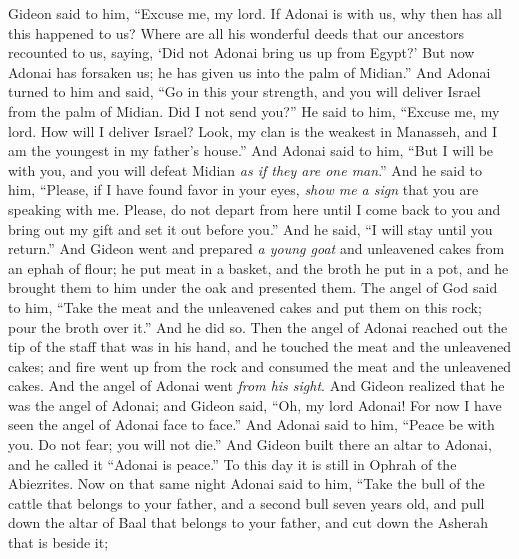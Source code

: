 \begin{biblechapter}
\verse Gideon said to him, “Excuse me, my lord. If Adonai is with us, why then has all this happened to us? Where are all his wonderful deeds that our ancestors recounted to us, saying, ‘Did not Adonai bring us up from Egypt?’ But now Adonai has forsaken us; he has given us into the palm of Midian.”
\verse And Adonai turned to him and said, “Go in this your strength, and you will deliver Israel from the palm of Midian. Did I not send you?”
\verse He said to him, “Excuse me, my lord. How will I deliver Israel? Look, my clan is the weakest in Manasseh, and I am the youngest in my father’s house.”
\verse And Adonai said to him, “But I will be with you, and you will defeat Midian \textit{as if they are one man}.”
\verse And he said to him, “Please, if I have found favor in your eyes, \textit{show me a sign} that you are speaking with me.
\verse Please, do not depart from here until I come back to you and bring out my gift and set it out before you.” And he said, “I will stay until you return.”
\verse And Gideon went and prepared \textit{a young goat} and unleavened cakes from an ephah of flour; he put meat in a basket, and the broth he put in a pot, and he brought them to him under the oak and presented them.
\verse The angel of God said to him, “Take the meat and the unleavened cakes and put them on this rock; pour the broth over it.” And he did so.
\verse Then the angel of Adonai reached out the tip of the staff that was in his hand, and he touched the meat and the unleavened cakes; and fire went up from the rock and consumed the meat and the unleavened cakes. And the angel of Adonai went \textit{from his sight}.
\verse And Gideon realized that he was the angel of Adonai; and Gideon said, “Oh, my lord Adonai! For now I have seen the angel of Adonai face to face.”
\verse And Adonai said to him, “Peace be with you. Do not fear; you will not die.”
\verse And Gideon built there an altar to Adonai, and he called it “Adonai is peace.” To this day it is still in Ophrah of the Abiezrites.
\verse Now on that same night Adonai said to him, “Take the bull of the cattle that belongs to your father, and a second bull seven years old, and pull down the altar of Baal that belongs to your father, and cut down the Asherah that is beside it;

\end{biblechapter}

